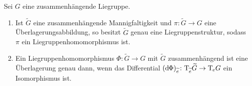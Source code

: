 \begin{lemma}[label=lem:132,{name=[{Liegruppenstruktur der Überlagerung einer Liegruppe}]}]
    Sei $G$ eine zusammenhängende Liegruppe.
    \begin{enumerate}[1)]
        \item Ist $\widetilde{G}$ eine zusammenhängende Mannigfaltigkeit und $\pi \colon \widetilde{G} \to G$ eine Überlagerungsabbildung, so besitzt $\widetilde{G}$ genau eine Liegruppenstruktur, sodass $\pi$ ein Liegruppenhomomorphismus ist.
        \item Ein Liegruppenhomomorphismus $\Phi \colon \widetilde{G} \to G$ mit $\widetilde{G}$ zusammenhängend ist eine Überlagerung genau dann, wenn das Differential $(\mathrm{d}\mkern-1.0mu \Phi)_{\widetilde{e}} \colon \mathrm{T}\mkern-0.85mu_{\widetilde{e}} \widetilde{G} \to \mathrm{T}\mkern-0.85mu_e G$ ein Isomorphismus ist.
    \end{enumerate}
\end{lemma}
